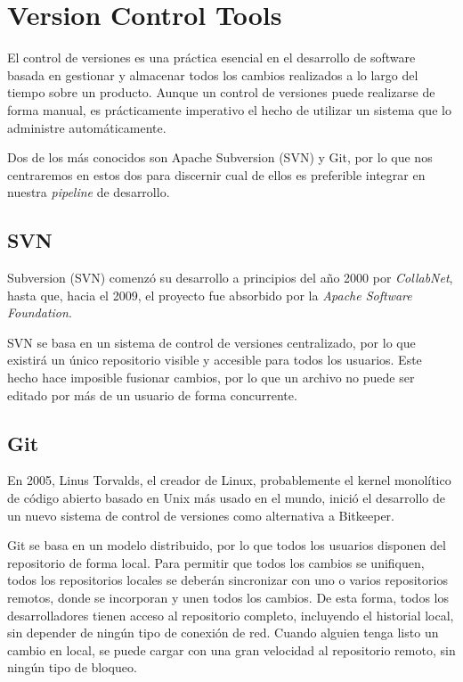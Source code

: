 \section{Version Control Tools}

El control de versiones es una práctica esencial en el desarrollo de software basada en gestionar y almacenar todos los cambios realizados a lo largo del tiempo sobre un producto.
Aunque un control de versiones puede realizarse de forma manual, es prácticamente imperativo el hecho de utilizar un sistema que lo administre automáticamente.

\vspace{10px}

Dos de los más conocidos son Apache Subversion (SVN) y Git, por lo que nos centraremos en estos dos para discernir cual de ellos es preferible integrar en nuestra \textit{pipeline} de desarrollo.

\subsection{SVN}
Subversion (SVN) comenzó su desarrollo a principios del año 2000 por \textit{CollabNet}, hasta que, hacia el 2009, el proyecto fue absorbido por la \textit{Apache Software Foundation}.

\vspace{10px}

SVN se basa en un sistema de control de versiones centralizado, por lo que existirá un único repositorio visible y accesible para todos los usuarios. Este hecho hace imposible fusionar cambios, por lo que un archivo no puede ser editado por más de un usuario de forma concurrente.

\subsection{Git}
En 2005, Linus Torvalds, el creador de Linux, probablemente el kernel monolítico de código abierto basado en Unix más usado en el mundo, inició el desarrollo de un nuevo sistema de control de versiones como alternativa a Bitkeeper.

\vspace{10px}

Git se basa en un modelo distribuido, por lo que todos los usuarios disponen del repositorio de forma local. Para permitir que todos los cambios se unifiquen, todos los repositorios locales se deberán sincronizar con uno o varios repositorios remotos, donde se incorporan y unen todos los cambios.
De esta forma, todos los desarrolladores tienen acceso al repositorio completo, incluyendo el historial local, sin depender de ningún tipo de conexión de red. Cuando alguien tenga listo un cambio en local, se puede cargar con una gran velocidad al repositorio remoto, sin ningún tipo de bloqueo.

\pagebreak
